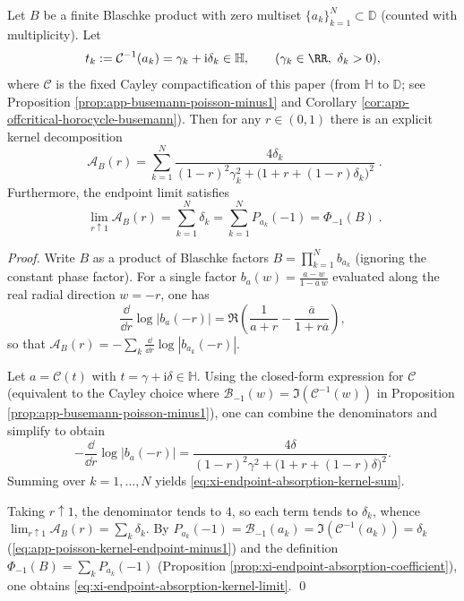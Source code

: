 \begin{theorem}\label{thm:xi-endpoint-absorption-kernel-representation}
Let \(B\) be a finite Blaschke product with zero multiset \(\{a_k\}_{k=1}^{N}\subset\mathbb{D}\) (counted with multiplicity).
Let
\[
t_k:=\mathcal{C}^{-1}(a_k)=\gamma_k+\mathrm{i}\delta_k\in\mathbb{H},
\qquad (\gamma_k\in\RR,\ \delta_k>0),
\]
where \(\mathcal{C}\) is the fixed Cayley compactification of this paper (from \(\mathbb{H}\) to \(\mathbb{D}\); see Proposition \ref{prop:app-busemann-poisson-minus1} and Corollary \ref{cor:app-offcritical-horocycle-busemann}).
Then for any \(r\in(0,1)\) there is an explicit kernel decomposition
\begin{equation}\label{eq:xi-endpoint-absorption-kernel-sum}
\boxed{\;
\mathcal{A}_B(r)
=\sum_{k=1}^{N}
\frac{4\delta_k}{(1-r)^2\gamma_k^2+\bigl(1+r+(1-r)\delta_k\bigr)^2}\; }.
\end{equation}
Furthermore, the endpoint limit satisfies
\begin{equation}\label{eq:xi-endpoint-absorption-kernel-limit}
\boxed{\;
\lim_{r\uparrow 1}\mathcal{A}_B(r)
=\sum_{k=1}^{N}\delta_k
=\sum_{k=1}^{N}P_{a_k}(-1)
=\Phi_{-1}(B)\; }.
\end{equation}
\end{theorem}

\begin{proof}
Write \(B\) as a product of Blaschke factors \(B=\prod_{k=1}^{N}b_{a_k}\) (ignoring the constant phase factor).
For a single factor \(b_a(w)=\frac{a-w}{1-\overline{a}\,w}\) evaluated along the real radial direction \(w=-r\), one has
\[
\frac{\dd}{\dd r}\log|b_a(-r)|
=\Re\!\left(\frac{1}{a+r}-\frac{\overline a}{1+r\overline a}\right),
\]
so that \(\mathcal{A}_B(r)=-\sum_k \frac{\dd}{\dd r}\log|b_{a_k}(-r)|\).
\par
Let \(a=\mathcal{C}(t)\) with \(t=\gamma+\mathrm{i}\delta\in\mathbb{H}\).
Using the closed-form expression for \(\mathcal{C}\) (equivalent to the Cayley choice where \(\mathcal{B}_{-1}(w)=\Im(\mathcal{C}^{-1}(w))\) in Proposition \ref{prop:app-busemann-poisson-minus1}), one can combine the denominators and simplify to obtain
\[
-\frac{\dd}{\dd r}\log|b_a(-r)|
=\frac{4\delta}{(1-r)^2\gamma^2+\bigl(1+r+(1-r)\delta\bigr)^2}.
\]
Summing over \(k=1,\dots,N\) yields \eqref{eq:xi-endpoint-absorption-kernel-sum}.
\par
Taking \(r\uparrow 1\), the denominator tends to \(4\), so each term tends to \(\delta_k\), whence
\(\lim_{r\uparrow 1}\mathcal{A}_B(r)=\sum_k\delta_k\).
By \(P_{a_k}(-1)=\mathcal{B}_{-1}(a_k)=\Im(\mathcal{C}^{-1}(a_k))=\delta_k\) (\eqref{eq:app-poisson-kernel-endpoint-minus1}) and the definition \(\Phi_{-1}(B)=\sum_k P_{a_k}(-1)\) (Proposition \ref{prop:xi-endpoint-absorption-coefficient}), one obtains \eqref{eq:xi-endpoint-absorption-kernel-limit}. \qed
\end{proof}

